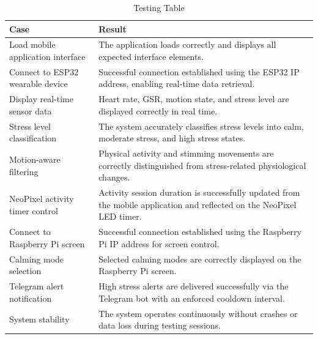 \documentclass[a4paper,12pt]{report}
\begin{document}
\begin{table}[h]
\centering
\caption{Testing Table}
\renewcommand{\arraystretch}{1.3}

\begin{tabular}{|p{5cm}|p{9cm}|}
\hline
\textbf{Case} & \textbf{Result} \\
\hline

Load mobile application interface &
The application loads correctly and displays all expected interface elements. \\
\hline

Connect to ESP32 wearable device &
Successful connection established using the ESP32 IP address, enabling real-time data retrieval. \\
\hline

Display real-time sensor data &
Heart rate, GSR, motion state, and stress level are displayed correctly in real time. \\
\hline

Stress level classification &
The system accurately classifies stress levels into calm, moderate stress, and high stress states. \\
\hline

Motion-aware filtering &
Physical activity and stimming movements are correctly distinguished from stress-related physiological changes. \\
\hline

NeoPixel activity timer control &
Activity session duration is successfully updated from the mobile application and reflected on the NeoPixel LED timer. \\
\hline

Connect to Raspberry Pi screen &
Successful connection established using the Raspberry Pi IP address for screen control. \\
\hline

Calming mode selection &
Selected calming modes are correctly displayed on the Raspberry Pi screen. \\
\hline

Telegram alert notification &
High stress alerts are delivered successfully via the Telegram bot with an enforced cooldown interval. \\
\hline

System stability &
The system operates continuously without crashes or data loss during testing sessions. \\
\hline

\end{tabular}
\label{tab:mobile_testing}
\end{table}
\end{document}
